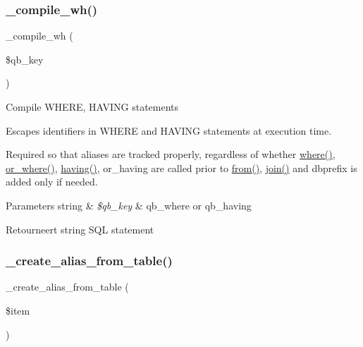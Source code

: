 \subsubsection{\texorpdfstring{\_compile\_wh()}{\_compile\_wh()}}
{\footnotesize\ttfamily \+\_\+compile\+\_\+wh (\begin{DoxyParamCaption}\item[{}]{\$qb\+\_\+key }\end{DoxyParamCaption})\hspace{0.3cm}{\ttfamily [protected]}}

Compile W\+H\+E\+RE, H\+A\+V\+I\+NG statements

Escapes identifiers in W\+H\+E\+RE and H\+A\+V\+I\+NG statements at execution time.

Required so that aliases are tracked properly, regardless of whether \mbox{\hyperlink{class_c_i___d_b__query__builder_a2356c4b7b93fb83c62a354a8a0748222}{where()}}, \mbox{\hyperlink{class_c_i___d_b__query__builder_a8d25e93a09f60fbe77541d0faef29bf0}{or\+\_\+where()}}, \mbox{\hyperlink{class_c_i___d_b__query__builder_af19efb51311e6f648a0035a0f94fceb6}{having()}}, or\+\_\+having are called prior to \mbox{\hyperlink{class_c_i___d_b__query__builder_a91f5f004ed8e2237a4decc5d23ac3457}{from()}}, \mbox{\hyperlink{class_c_i___d_b__query__builder_a54557b1ef757507cbbd2a8802a99810b}{join()}} and dbprefix is added only if needed.


\begin{DoxyParams}[1]{Parameters}
string & {\em \$qb\+\_\+key} & \textquotesingle{}qb\+\_\+where\textquotesingle{} or \textquotesingle{}qb\+\_\+having\textquotesingle{} \\
\hline
\end{DoxyParams}
\begin{DoxyReturn}{Retourneert}
string S\+QL statement 
\end{DoxyReturn}
\mbox{\label{class_c_i___d_b__query__builder_a194edea7be9a8636b67b7d2c8a3de04e}} 
\subsubsection{\texorpdfstring{\_create\_alias\_from\_table()}{\_create\_alias\_from\_table()}}
{\footnotesize\ttfamily \+\_\+create\+\_\+alias\+\_\+from\+\_\+table (\begin{DoxyParamCaption}\item[{}]{\$item }\end{DoxyParamCaption})\hspace{0.3cm}{\ttfamily [protected]}}

